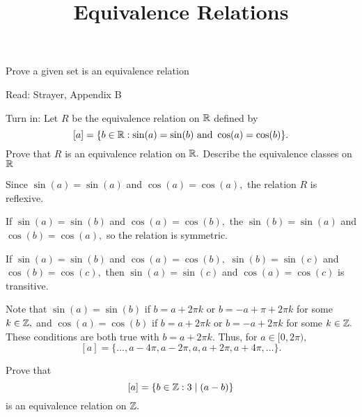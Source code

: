 \documentclass{ximera}
\title{Equivalence Relations}
\begin{document}
\begin{abstract}
\end{abstract}
\maketitle

\begin{obj}
  \item Prove a given set is an equivalence relation
\end{obj}

\begin{pre}
  \item[Read:] Strayer, Appendix B
  \item[Turn in:] Let $R$ be the equivalence relation on $\mathbb R$
  defined by
  \[
 [a]=\{b\in\mathbb R:\sin(a)=\sin(b) \textnormal{ and }\cos(a)=\cos(b)\}.\]
   Prove that $R$ is an equivalence relation on $\mathbb R.$
 Describe the equivalence classes on $\mathbb R$
 
 \begin{solution}
      Since $\sin(a)=\sin(a)$ and $\cos(a)=\cos(a),$ the relation $R$ is reflexive.

      If $\sin(a)=\sin(b)$ and $\cos(a)=\cos(b),$ the $\sin(b)=\sin(a)$ and $\cos(b)=\cos(a),$ so the relation is symmetric.

      If $\sin(a)=\sin(b)$ and $\cos(a)=\cos(b),$ $\sin(b)=\sin(c)$ and $\cos(b)=\cos(c),$ then $\sin(a)=\sin(c)$ and $\cos(a)=\cos(c)$ is transitive.

      Note that $\sin(a)=\sin(b)$ if $b=a+2\pi k$ or $b=-a+\pi+2\pi k$ for some $k\in\mathbb Z,$ and  $\cos(a)=\cos(b)$ if $b=a+2\pi k$ or $b=-a+2\pi k$ for some $k\in\mathbb Z.$ These conditions are both true with $b=a+2\pi k$. Thus, for $a\in[0,2\pi),$
      \[
          [a]=\{\dots,a-4\pi,a-2\pi,a,a+2\pi,a+4\pi,\dots\}.
      \]
     \end{solution}
\end{pre}
  

\begin{br}
    Prove that \[[a]=\{b\in\mathbb Z: 3\mid(a-b)\}\] is an equivalence relation on $\mathbb Z.$
  \end{br}
  
\end{document}
